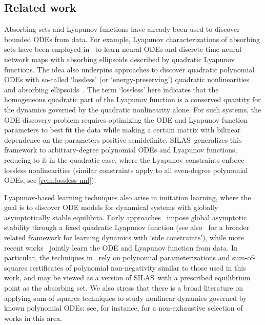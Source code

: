 \documentclass[11pt]{amsart}
\numberwithin{equation}{section}
\theoremstyle{plain}
\theoremstyle{definition}
\theoremstyle{remark}
\newcommand{\methodname}{{SILAS}}
\begin{document}
\subsection{Related work}
Absorbing sets and Lyapunov functions have already been used to discover bounded ODEs from data. For example, Lyapunov characterizations of absorbing sets have been employed in~\cite{Tang2024,goertzen2025learning} to learn neural ODEs and discrete-time neural-network maps with absorbing ellipsoids described by quadratic Lyapunov functions. The idea also underpins approaches to discover quadratic polynomial ODEs with so-called `lossless' (or `energy-preserving') quadratic nonlinearities and absorbing ellipsoids~\cite{SchlegelNoack2015,kaptanoglu2021, peng2025extending,liao2025lossless}. The term `lossless' here indicates that the homogeneous quadratic part of the Lyapunov function is a conserved quantity for the dynamics governed by the quadratic nonlinearity alone. For such systems, the ODE discovery problem requires optimizing the ODE and Lyapunov function parameters to best fit the data while making a certain matrix with bilinear dependence on the parameters positive semidefinite. 
\methodname\ generalizes this framework to arbitrary-degree polynomial ODEs and Lyapunov functions, reducing to it in the quadratic case, where the Lyapunov constraints enforce lossless nonlinearities (similar constraints apply to all even-degree polynomial ODEs, see \cref{rem:lossless-nnl}).

Lyapunov-based learning techniques also arise in imitation learning, where the goal is to discover ODE models for dynamical systems with globally asymptotically stable equilibria. Early approaches~\cite{5953529} impose global asymptotic stability through a fixed quadratic Lyapunov function (see also~\cite{ahmadi2023side} for a broader related framework for learning dynamics with `side constraints'), while more recent works~\cite{pmlr-v229-abyaneh23a,abyaneh2024globally} jointly learn the ODE and Lyapunov function from data. In particular, the techniques in~\cite{pmlr-v229-abyaneh23a} rely on polynomial parameterizations and sum-of-squares certificates of polynomial non-negativity similar to those used in this work, and may be viewed as a version of \methodname\ with a prescribed equilibrium point as the absorbing set. We also stress that there is a broad literature on applying sum-of-squares techniques to study nonlinear dynamics governed by known polynomial ODEs; see, for instance, \cite{Antonis2005,Lasserre2008,Parrilo2013,Henrion2014,Korda2014,Fantuzzi2016,Goluskin2020} for a non-exhaustive selection of works in this area.
\end{document}
